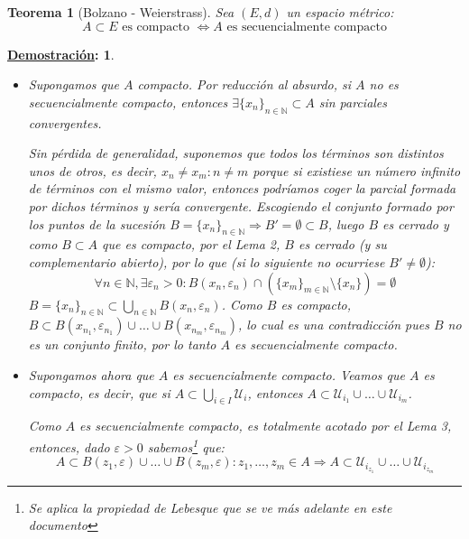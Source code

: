 \documentclass[10pt,a4paper,openright]{book}
\theoremstyle{break}
\newtheorem*{theo}{Teorema}
\newtheorem*{demo}{\underline{Demostración}:}
\begin{document}
\begin{theo}[Bolzano - Weierstrass]
Sea $(E,d)$ un espacio métrico:
$$A \subset E \mbox{ es compacto }\Leftrightarrow A \mbox{ es secuencialmente compacto}$$
\end{theo}

\begin{demo}
\begin{itemize}
\item \fbox{$\Rightarrow$}

Supongamos que $A$ compacto. Por reducción al absurdo, si $A$ no es secuencialmente compacto, entonces $\exists \{x_n\}_{n \in \mathbb{N}} \subset A$ sin parciales convergentes.

Sin pérdida de generalidad, suponemos que todos los términos son distintos unos de otros, es decir, $x_n \neq x_m : n \neq m$ porque si existiese un número infinito de términos con el mismo valor, entonces podríamos coger la parcial formada por dichos términos y sería convergente. Escogiendo el conjunto formado por los puntos de la sucesión $B = \{x_n\}_{n \in \mathbb{N}} \Rightarrow B' = \emptyset \subset B$, luego $B$ es cerrado y como $B \subset A$ que es compacto, por el Lema 2, $B$ es cerrado (y su complementario abierto), por lo que (si lo siguiente no ocurriese $B'\neq \emptyset$):
$$\forall n \in \mathbb{N}, \exists \varepsilon_n > 0 : B(x_n, \varepsilon_n) \cap \left( \{x_m\}_{m \in \mathbb{N}} \setminus \{x_n\}\right) = \emptyset$$
$B = \{x_n\}_{n \in \mathbb{N}}  \subset \bigcup_{n \in \mathbb{N}} B(x_n, \varepsilon_n)$. Como $B$ es compacto, $B \subset B(x_{n_1}, \varepsilon_{n_1}) \cup \ldots \cup B(x_{n_m}, \varepsilon_{n_m})$, lo cual es una contradicción pues $B$ no es un conjunto finito, por lo tanto $A$ es secuencialmente compacto.

\item \fbox{$\Leftarrow$}

Supongamos ahora que $A$ es secuencialmente compacto. Veamos que $A$ es compacto, es decir, que si $A \subset \bigcup_{i \in I} \mathcal{U}_i$, entonces $A \subset \mathcal{U}_{i_1} \cup \ldots \cup  \mathcal{U}_{i_m}$.

Como $A$ es secuencialmente compacto, es totalmente acotado por el Lema 3, entonces, dado $\varepsilon > 0$ sabemos\footnote{Se aplica la propiedad de Lebesque que se ve más adelante en este documento} que:
$$A \subset B(z_1, \varepsilon) \cup \ldots \cup B(z_m, \varepsilon) : z_1, \ldots, z_m \in A \Rightarrow A \subset \mathcal{U}_{i_{z_1}} \cup \ldots \cup \mathcal{U}_{i_{z_m}}$$
\end{itemize}

\end{demo}
\end{document}
